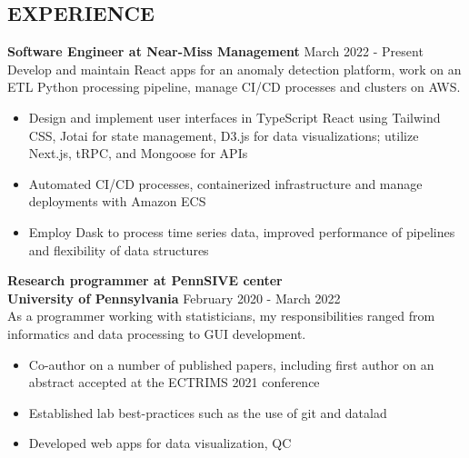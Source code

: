 \documentclass[margin]{res}
\begin{document}
\begin{resume}
\section{EXPERIENCE}
\textbf{Software Engineer at Near-Miss Management} \hfill        March 2022 - Present\\
Develop and maintain React apps for an anomaly detection platform, work on an ETL Python processing pipeline, manage CI/CD processes and clusters on AWS.
\begin{itemize}
    \item Design and implement user interfaces in TypeScript React using Tailwind CSS, Jotai for state management, D3.js for data visualizations; utilize Next.js, tRPC, and Mongoose for APIs
    \item Automated CI/CD processes, containerized infrastructure and manage deployments with Amazon ECS
    \item Employ Dask to process time series data, improved performance of pipelines and flexibility of data structures
\end{itemize}
\textbf{Research programmer at PennSIVE center}\\
\textbf{University of Pennsylvania} \hfill        February 2020 - March 2022\\
As a programmer working with statisticians, my responsibilities ranged from informatics and data processing to GUI development. %
\begin{itemize}
    \item Co-author on a number of published papers, including first author on an abstract accepted at the ECTRIMS 2021 conference
    \item Established lab best-practices such as the use of git and datalad
    \item Developed web apps for data visualization, QC
\end{itemize}


\end{resume}
\end{document}
